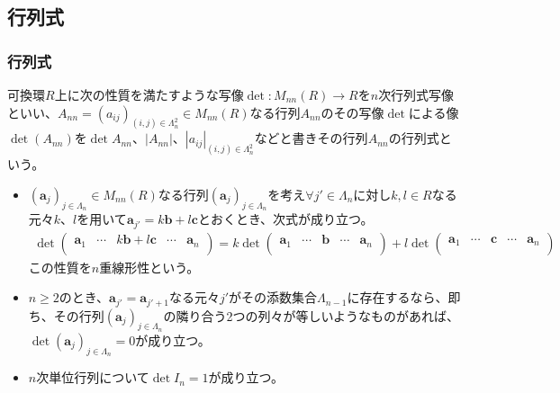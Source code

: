 \documentclass[dvipdfmx]{jsarticle}
\begin{document}
\subsection{行列式}%
\subsubsection{行列式}%
\begin{axs}[行列式写像の公理]
可換環$R$上に次の性質を満たすような写像$\det:M_{nn}(R) \rightarrow R$を$n$次行列式写像といい、$A_{nn} = \left( a_{ij} \right)_{(i,j) \in \varLambda_{n}^{2}} \in M_{nn}(R)$なる行列$A_{nn}$のその写像$\det$による像$\det\left( A_{nn} \right)$を$\det A_{nn}$、$\left| A_{nn} \right|$、$\left| a_{ij} \right|_{(i,j) \in \varLambda_{n}^{2}}$などと書きその行列$A_{nn}$の行列式という。
\begin{itemize}
\item
  $\left( \mathbf{a}_{j} \right)_{j \in \varLambda_{n}} \in M_{nn}(R)$なる行列$\left( \mathbf{a}_{j} \right)_{j \in \varLambda_{n}}$を考え$\forall j' \in \varLambda_{n}$に対し$k,l \in R$なる元々$k$、$l$を用いて$\mathbf{a}_{j'} = k\mathbf{b} + l\mathbf{c}$とおくとき、次式が成り立つ。
\begin{align*}
\det\begin{pmatrix}
\mathbf{a}_{1} & \cdots & k\mathbf{b} + l\mathbf{c} & \cdots & \mathbf{a}_{n} \\
\end{pmatrix} = k\det\begin{pmatrix}
\mathbf{a}_{1} & \cdots & \mathbf{b} & \cdots & \mathbf{a}_{n} \\
\end{pmatrix} + l\det\begin{pmatrix}
\mathbf{a}_{1} & \cdots & \mathbf{c} & \cdots & \mathbf{a}_{n} \\
\end{pmatrix}
\end{align*}
この性質を$n$重線形性という。
\item
  $n \geq 2$のとき、$\mathbf{a}_{j'} = \mathbf{a}_{j' + 1}$なる元々$j'$がその添数集合$\varLambda_{n - 1}$に存在するなら、即ち、その行列$\left( \mathbf{a}_{j} \right)_{j \in \varLambda_{n}}$の隣り合う2つの列々が等しいようなものがあれば、$\det\left( \mathbf{a}_{j} \right)_{j \in \varLambda_{n}} = 0$が成り立つ。
\item
  $n$次単位行列について$\det I_{n} = 1$が成り立つ。
\end{itemize}
\end{axs}
\end{document}
